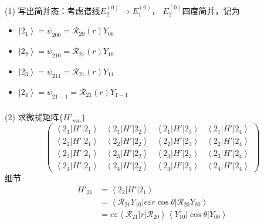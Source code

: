 \begin{frame}
  \frametitle{}
(1) 写出简并态：考虑谱线$E_2^{(0)}\to E_1^{(0)}$， $E_2^{(0)}$四度简并，记为
\begin{itemize}
  \item $ \left\vert 2_1 \right\rangle = \psi _{200} =\mathscr{R}_{20}(r) Y_{00}$ 
  \item $ \left\vert 2_2 \right\rangle = \psi _{210} =\mathscr{R}_{21}(r) Y_{10} $ 
  \item $ \left\vert 2_3 \right\rangle = \psi _{211}=\mathscr{R}_{21}(r) Y_{11}  $ 
  \item $ \left\vert 2_4 \right\rangle = \psi _{21-1} =\mathscr{R}_{21}(r) Y_{1-1} $
\end{itemize}
\end{frame} 

\begin{frame}
  \frametitle{}
  (2) 求微扰矩阵$\{H'_{nm}\}$
  $$ \begin{pmatrix}
    \left\langle 2_1 \right\vert H' \left\vert 2_1 \right\rangle & \left\langle 2_1 \right\vert H' \left\vert 2_2 \right\rangle & \left\langle 2_1 \right\vert H' \left\vert 2_3 \right\rangle & \left\langle 2_1 \right\vert H' \left\vert 2_4 \right\rangle \\
    \left\langle 2_2 \right\vert H' \left\vert 2_1 \right\rangle & \left\langle 2_2 \right\vert H' \left\vert 2_2 \right\rangle & \left\langle 2_2 \right\vert H' \left\vert 2_3 \right\rangle & \left\langle 2_2 \right\vert H' \left\vert 2_4 \right\rangle \\
    \left\langle 2_3 \right\vert H' \left\vert 2_1 \right\rangle & \left\langle 2_3 \right\vert H' \left\vert 2_2 \right\rangle & \left\langle 2_3 \right\vert H' \left\vert 2_3 \right\rangle & \left\langle 2_3 \right\vert H' \left\vert 2_4 \right\rangle \\
    \left\langle 2_4 \right\vert H' \left\vert 2_1 \right\rangle & \left\langle 2_4 \right\vert H' \left\vert 2_2 \right\rangle & \left\langle 2_4 \right\vert H' \left\vert 2_3 \right\rangle & \left\langle 2_4 \right\vert H' \left\vert 2_4 \right\rangle 
  \end{pmatrix} $$
  细节
  $$
  \begin{aligned}
    H'_{21} &= \left\langle 2_2 \right\vert H' \left\vert 2_1 \right\rangle   
     \\ 
     &= \left\langle \mathscr{R}_{21}Y_{10} \right\vert e \varepsilon r \cos\theta \left\vert \mathscr{R}_{20} Y_{00} \right\rangle   
     \\ 
     &= e \varepsilon\left\langle \mathscr{R}_{21}  \right\vert  r \left\vert \mathscr{R}_{20} \right\rangle  \left\langle  Y_{10} \right\vert \cos\theta \left\vert Y_{00} \right\rangle   
     \\ 
  \end{aligned}
  $$ 
\end{frame} 

